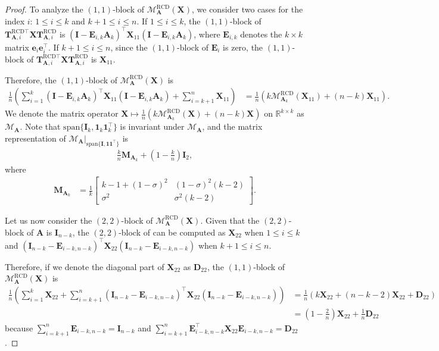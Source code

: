 \documentclass{article}
\theoremstyle{plain}
\theoremstyle{definition}
\theoremstyle{remark}
\def\bigopen#1{\left(#1\right)}
\renewcommand{\sp}{\mathrm{span}}
\newcommand{\RCD}{\text{RCD}} %
\newcommand{\MARCD}{\mathcal{M}_{\bm{A}}^{\RCD}} %
\def\vone{{\bm{1}}}
\def\ve{{\bm{e}}}
\def\mA{{\bm{A}}}
\def\mD{{\bm{D}}}
\def\mE{{\bm{E}}}
\def\mI{{\bm{I}}}
\def\mM{{\bm{M}}}
\def\mT{{\bm{T}}}
\def\mX{{\bm{X}}}
\def\gM{{\mathcal{M}}}
\newcommand{\R}{\mathbb{R}}
\begin{document}
\begin{proof}
To analyze the $(1,1)$-block of $\MARCD(\mX)$, we consider two cases for the index $i$: $1 \le i \le k$ and $k+1 \le i \le n$.
If $1\le i\le k$, the $(1,1)$-block of $\mT_{\mA, i}^{\RCD \top} \mX \mT_{\mA, i}^{\RCD}$ is $(\mI-\mE_{i,k}\mA_k)^{\top} \mX_{11} (\mI-\mE_{i,k}\mA_k)$, where $\mE_{i,k}$ denotes the $k\times k$ matrix $\ve_i \ve_i^{\top}$. If $k+1\le i\le n$, since the $(1,1)$-block of $\mE_{i}$ is zero, the $(1,1)$-block of $\mT_{\mA, i}^{\RCD \top} \mX \mT_{\mA, i}^{\RCD}$ is $\mX_{11}$.

Therefore, the $(1,1)$-block of $\MARCD(\mX)$ is 
\begin{align*}
    \frac{1}{n} \bigopen{\sum_{i=1}^k (\mI-\mE_{i,k}\mA_k)^{\top} \mX_{11} (\mI-\mE_{i,k}\mA_k) + \sum_{i=k+1}^n \mX_{11}} &= \frac{1}{n} \bigopen{k\gM_{\mA_k}^{\RCD}(\mX_{11}) + (n-k)\mX_{11}}.
\end{align*}
We denote the matrix operator $\mX \mapsto \frac{1}{n} \bigopen{k\gM_{\mA_k}^{\RCD}(\mX) + (n-k)\mX}$ on $\R^{k\times k}$ as $\gM_{\mA}$. Note that $\sp\{\mI_k, \vone_k \vone_k^{\top}\}$ is invariant under $\gM_{\mA}$, and the matrix representation of $\left. \gM_{\mA} \right|_{\sp \{ \mI, \vone \vone^{\top}\}}$ is 
\begin{align*}
    \frac{k}{n} \mM_{\mA_k} + \bigopen{1-\frac{k}{n}} \mI_2,
\end{align*}
where
\begin{align*}
    \mM_{\mA_k} &= \frac{1}{k}\begin{bmatrix}
        k-1+(1-\sigma)^2 & (1-\sigma)^2 (k-2) \\
        \sigma^2 & \sigma^2 (k-2)
    \end{bmatrix}.
\end{align*}

Let us now consider the $(2,2)$-block of $\MARCD(\mX)$. Given that the $(2,2)$-block of $\mA$ is $\mI_{n-k}$, the $(2,2)$-block of can be computed as $\mX_{22}$ when $1\le i\le k$ and $(\mI_{n-k}-\mE_{i-k, n-k})^{\top} \mX_{22} (\mI_{n-k}-\mE_{i-k, n-k})$ when $k+1\le i\le n$. 

Therefore, if we denote the diagonal part of $\mX_{22}$ as $\mD_{22}$, the $(1,1)$-block of $\MARCD(\mX)$ is 
\begin{align*}
    \frac{1}{n} \bigopen{\sum_{i=1}^k \mX_{22} + \sum_{i=k+1}^n (\mI_{n-k}-\mE_{i-k, n-k})^{\top} \mX_{22} (\mI_{n-k}-\mE_{i-k, n-k})} &= \frac{1}{n} \bigopen{k\mX_{22} + (n-k-2)\mX_{22} + \mD_{22}} \\
    &= \bigopen{1-\frac{2}{n}}\mX_{22} + \frac{1}{n} \mD_{22}
\end{align*}
because $\sum_{i=k+1}^n \mE_{i-k, n-k} = \mI_{n-k}$ and $\sum_{i=k+1}^n \mE_{i-k, n-k}^{\top} \mX_{22} \mE_{i-k, n-k} = \mD_{22}$.


\end{proof}
\end{document}

